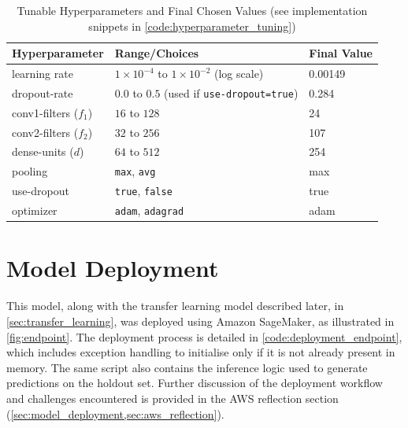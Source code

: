 \begin{table}[h]
    \centering
    \caption{Tunable Hyperparameters and Final Chosen Values (see implementation snippets in \cref{code:hyperparameter_tuning})}
    \begin{tabular}{lll}
    \toprule
    \textbf{Hyperparameter} & \textbf{Range/Choices} & \textbf{Final Value} \\
    \midrule
    learning rate           & $1{\times}10^{-4}$ to $1{\times}10^{-2}$ (log scale) & 0.00149 \\
    dropout-rate            & $0.0$ to $0.5$ (used if \texttt{use-dropout=true}) & 0.284 \\
    conv1-filters ($f_1$)   & $16$ to $128$ & 24 \\
    conv2-filters ($f_2$)   & $32$ to $256$ & 107 \\
    dense-units ($d$)       & $64$ to $512$ & 254 \\
    pooling                 & \texttt{max}, \texttt{avg} & max \\
    use-dropout             & \texttt{true}, \texttt{false} & true \\
    optimizer               & \texttt{adam}, \texttt{adagrad} & adam \\
    \bottomrule
    \end{tabular}
    \label{tab:tunable_hyperparameters}
\end{table}

\begin{figure}[h]
    
\end{figure}

\begin{figure}[p]
    
\end{figure}

\newpage

\section{Model Deployment} \label{sec:model_deployment}

This model, along with the transfer learning model described later, in \cref{sec:transfer_learning}, was deployed using Amazon SageMaker, as illustrated in \cref{fig:endpoint}. The deployment process is detailed in \cref{code:deployment_endpoint}, which includes exception handling to initialise  only if it is not already present in memory. The same script also contains the inference logic used to generate predictions on the holdout set. Further discussion of the deployment workflow and challenges encountered is provided in the AWS reflection section (\cref{sec:model_deployment,sec:aws_reflection}).


